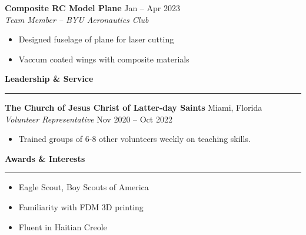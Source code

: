 \documentclass[a4paper,10pt]{article}
\newcommand{\sectionline}{\noindent\rule{\linewidth}{0.5pt}\vspace{-0.5em}}
\begin{document}
\textbf{Composite RC Model Plane} \hfill Jan -- Apr 2023 \\
\emph{Team Member -- BYU Aeronautics Club}
\begin{itemize}[noitemsep, topsep=0pt]
    \item Designed fuselage of plane for laser cutting
    \item Vaccum coated wings with composite materials
\end{itemize}  

\textbf{Leadership \& Service} \vspace{-1em}\\
\sectionline

\textbf{The Church of Jesus Christ of Latter-day Saints} \hfill Miami, Florida \\
\emph{Volunteer Representative} \hfill Nov 2020 -- Oct 2022
\begin{itemize}[noitemsep, topsep=0pt]
    \item Trained groups of 6-8 other volunteers weekly on teaching skills.
\end{itemize}

\textbf{Awards \& Interests} \vspace{-1em}\\
\sectionline

\begin{itemize}[noitemsep, topsep=0pt]
    \item Eagle Scout, Boy Scouts of America
    \item Familiarity with FDM 3D printing
    \item Fluent in Haitian Creole
\end{itemize}
\end{document}
